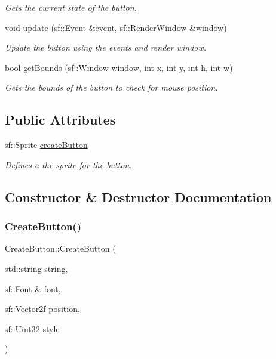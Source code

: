 \begin{DoxyCompactItemize}
\begin{DoxyCompactList}\small\item\em Gets the current state of the button. \end{DoxyCompactList}\item 
void \hyperlink{class_create_button_aae831bb222ab9c712f07d7c9d0e16f20}{update} (sf\+::\+Event \&event, sf\+::\+Render\+Window \&window)
\begin{DoxyCompactList}\small\item\em Update the button using the events and render window. \end{DoxyCompactList}\item 
bool \hyperlink{class_create_button_a2b5c1c9cd11ecfe5ab09c746a0b9365b}{get\+Bounds} (sf\+::\+Window window, int x, int y, int h, int w)
\begin{DoxyCompactList}\small\item\em Gets the bounds of the button to check for mouse position. \end{DoxyCompactList}\end{DoxyCompactItemize}
\subsection*{Public Attributes}
\begin{DoxyCompactItemize}
\item 
\mbox{\label{class_create_button_acdbe267b489fa827cd9fcf64bcccbf8a}} 
sf\+::\+Sprite \hyperlink{class_create_button_acdbe267b489fa827cd9fcf64bcccbf8a}{create\+Button}
\begin{DoxyCompactList}\small\item\em Defines a the sprite for the button. \end{DoxyCompactList}\end{DoxyCompactItemize}


\subsection{Constructor \& Destructor Documentation}
\mbox{\label{class_create_button_a5401dea912167ef552e08e17f9baae16}} 
\subsubsection{\texorpdfstring{Create\+Button()}{CreateButton()}}
{\footnotesize\ttfamily Create\+Button\+::\+Create\+Button (\begin{DoxyParamCaption}\item[{std\+::string}]{string,  }\item[{sf\+::\+Font \&}]{font,  }\item[{sf\+::\+Vector2f}]{position,  }\item[{sf\+::\+Uint32}]{style }\end{DoxyParamCaption})}



